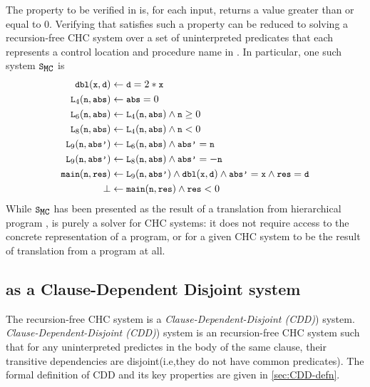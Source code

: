 The property to be verified in  is, for each input, 
returns a value greater than or equal to $0$.
Verifying that  satisfies such a property can be reduced
to solving a recursion-free CHC system over a set of uninterpreted predicates
that each represents a control location and
procedure name in .
%
In particular, one such system $\mcchc$ is
%
\begin{align*}
\label{chc}
\cc{dbl}(\cc{x}, \cc{d}) &\gets \cc{d} = 2 * \cc{x} \\
  \cc{L}_4(\cc{n}, \cc{abs}) &\gets  \cc{abs} = 0 \\
  \cc{L}_6(\cc{n}, \cc{abs}) &\gets \cc{L}_4(\cc{n}, \cc{abs}) \land \cc{n} \ge 0 \\
  \cc{L}_8(\cc{n}, \cc{abs}) &\gets \cc{L}_4(\cc{n}, \cc{abs}) \land \cc{n} < 0 \\
  \cc{L}_9(\cc{n}, \cc{abs'}) &\gets \cc{L}_6(\cc{n},\cc{abs}) \land \cc{abs'} = \cc{n} \\
   \cc{L}_9(\cc{n}, \cc{abs'}) &\gets \cc{L}_8(\cc{n},\cc{abs}) \land \cc{abs'} = -\cc{n} \\
   \cc{main}(\cc{n},\cc{res}) &\gets \cc{L}_9(\cc{n}, \cc{abs'}) \land
                                     \cc{dbl}(\cc{x}, \cc{d})
    \land \cc{abs'} = \cc{x} \land \cc{res} = \cc{d} \\
    \bot &\gets \cc{main}(\cc{n}, \cc{res}) \land \cc{res} < 0 
\end{align*}
%
While $\mcchc$ has been presented as the result
of a translation from hierarchical program , \sys is
purely a solver for CHC systems: it does not require access to the
concrete representation of a program, or for a given CHC system to be
the result of translation from a program at all.

\subsection{ as a Clause-Dependent Disjoint system}
\label{sec:solve-ex}
The recursion-free CHC system  is a \emph{Clause-Dependent-Disjoint (CDD)}) system.
\emph{Clause-Dependent-Disjoint (CDD)}) system is an recursion-free CHC system such that
for any uninterpreted predictes in the body of the same clause, their transitive dependencies
are disjoint(i.e,they do not have common predicates).
%
The formal definition of CDD and its key properties are given in
\autoref{sec:CDD-defn}.

